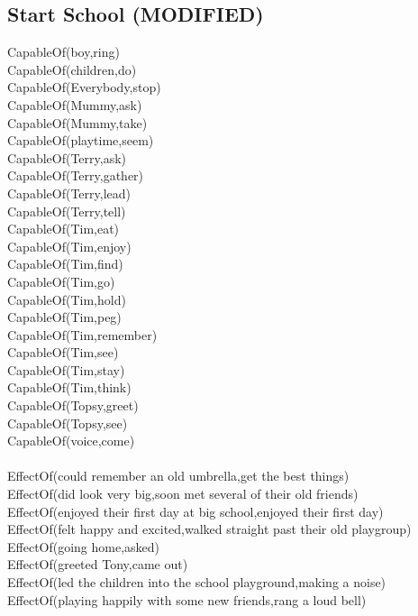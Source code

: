 \subsection{Start School (MODIFIED)}

\begin{multicols}{2}
\begin{footnotesize}
\noindent
CapableOf(boy,ring) \\
CapableOf(children,do) \\
CapableOf(Everybody,stop) \\
CapableOf(Mummy,ask) \\
CapableOf(Mummy,take) \\
CapableOf(playtime,seem) \\
CapableOf(Terry,ask) \\
CapableOf(Terry,gather) \\
CapableOf(Terry,lead) \\
CapableOf(Terry,tell) \\
CapableOf(Tim,eat) \\
CapableOf(Tim,enjoy) \\
CapableOf(Tim,find) \\
CapableOf(Tim,go) \\
CapableOf(Tim,hold) \\
CapableOf(Tim,peg) \\
CapableOf(Tim,remember) \\
CapableOf(Tim,see) \\
CapableOf(Tim,stay) \\
CapableOf(Tim,think) \\
CapableOf(Topsy,greet) \\
CapableOf(Topsy,see) \\
CapableOf(voice,come) \\
~\\
EffectOf(could remember an old umbrella,get the best things) \\
EffectOf(did look very big,soon met several of their old friends) \\
EffectOf(enjoyed their first day at big school,enjoyed their first day) \\
EffectOf(felt happy and excited,walked straight past their old playgroup) \\
EffectOf(going home,asked) \\
EffectOf(greeted Tony,came out) \\
EffectOf(led the children into the school playground,making a noise) \\
EffectOf(playing happily with some new friends,rang a loud bell) \\

\end{footnotesize}
\end{multicols}
